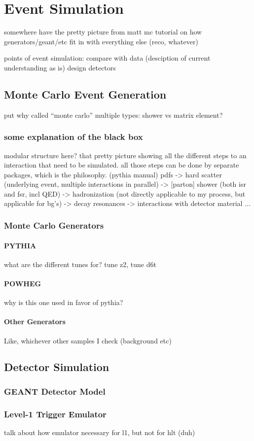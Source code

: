 \chapter{Event Simulation}
\label{sim}
somewhere have the pretty picture from 
matt mc tutorial on how generators/geant/etc 
fit in with everything else (reco, whatever)

points of event simulation: 
compare with data (desciption of current understanding as is) 
design detectors

\section{Monte Carlo Event Generation}
\label{sim:MC}
put why called ``monte carlo''
multiple types: shower vs matrix element?
\subsection{some explanation of the black box}
\label{sim:MCBlackBox}
modular structure here?  that pretty picture showing all the 
different steps to an interaction that need to be 
simulated. 
all those steps can be done by separate packages, 
which is the philosophy.  (pythia manual)
pdfs ->
hard scatter (underlying event, multiple interactions in parallel) ->
[parton] shower (both isr and fsr, incl QED) ->
hadronization (not directly applicable to my process, but applicable for bg's) -> 
decay resonances -> interactions with detector material ...
\subsection{Monte Carlo Generators}
\label{sim:MCGens}
\subsubsection{PYTHIA}
\label{sim:MCGensPythia}
what are the different tunes for?  tune z2, tune d6t
\subsubsection{POWHEG}
\label{sim:MCGensPowheg}
why is this one used in favor of pythia?  
\subsubsection{Other Generators}
\label{sim:MCGensOther}
Like, whichever other samples I check (background etc)

\section{Detector Simulation}
\label{sim:Detector}
\subsection{GEANT Detector Model}
\label{sim:DetectorGeant}

\subsection{Level-1 Trigger Emulator}
\label{sim:DetectorL1Emul}
talk about how emulator necessary for l1, but not for hlt (duh)
